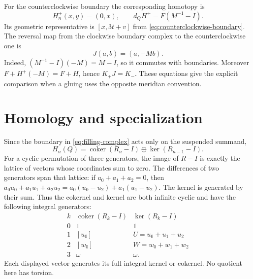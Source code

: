 \documentclass[11pt]{article}
\numberwithin{equation}{section}
\providecommand{\coker}{\operatorname{coker}}
\begin{document}
For the counterclockwise boundary the corresponding homotopy is
\begin{equation}\label{eq:positive-H}
 H_n^+(x,y)=(0,x),\qquad d_QH^+=F(M^{-1}-I).
\end{equation}
Its geometric representative is $[x,3t+v]$ from
\eqref{eq:counterclockwise-boundary}.
The reversal map from the clockwise boundary complex to the
counterclockwise one is
\[
 J(a,b)=(a,-Mb).
\]
Indeed, $(M^{-1}-I)(-M)=M-I$, so it commutes with boundaries.
Moreover $F+H^+(-M)=F+H$, hence $K_+J=K_-$.
These equations give the explicit comparison when a gluing uses the
opposite meridian convention.

\section{Homology and specialization}

Since the boundary in
\eqref{eq:filling-complex} acts only on the suspended summand,
\begin{equation}\label{eq:Q-homology}
 H_n(Q)=\coker(R_n-I)\oplus\ker(R_{n-1}-I).
\end{equation}
For a cyclic permutation of three generators, the image of $R-I$
is exactly the lattice of vectors whose coordinates sum to zero.
The differences of two generators span that lattice: if
$a_0+a_1+a_2=0$, then
$a_0u_0+a_1u_1+a_2u_2=a_0(u_0-u_2)+a_1(u_1-u_2)$.
The kernel is generated by their sum. Thus the cokernel and kernel
are both infinite cyclic and have the following integral generators:
\[
 \begin{array}{c|cc}
 k&\coker(R_k-I)&\ker(R_k-I)\\ \hline
 0&1&1\\
 1&[u_0]&U=u_0+u_1+u_2\\
 2&[w_0]&W=w_0+w_1+w_2\\
 3&\omega&\omega.
 \end{array}
\]
Each displayed vector generates its full integral kernel or cokernel.
No quotient here has torsion.
\end{document}
